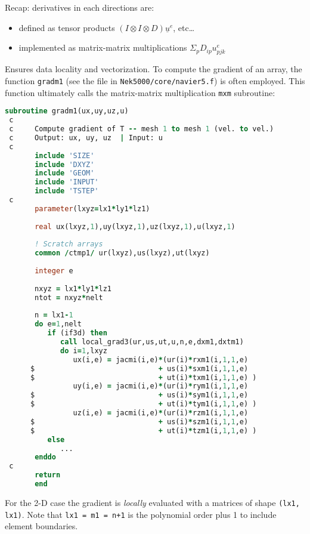 \documentclass[
  a4paper,
  10pt]{article}
\newcommand{\passthrough}[1]{#1}
\begin{document}
Recap: derivatives in each directions are:

\begin{itemize}
\item
  defined as tensor products \((I \otimes I \otimes D) \underline u^e\),
  etc\ldots{}
\item
  implemented as matrix-matrix multiplications
  \(\Sigma_p D_{ip}u^e_{pjk}\)
\end{itemize}

Ensures data locality and vectorization. To compute the gradient of an
array, the function \passthrough{\lstinline!gradm1!} (see the file in
\passthrough{\lstinline!Nek5000/core/navier5.f!}) is often employed.
This function ultimately calls the matrix-matrix multiplication
\passthrough{\lstinline!mxm!} subroutine:

\begin{lstlisting}[language=Fortran]
       subroutine gradm1(ux,uy,uz,u)
 c
 c     Compute gradient of T -- mesh 1 to mesh 1 (vel. to vel.)
 c     Output: ux, uy, uz  | Input: u
 c
       include 'SIZE'
       include 'DXYZ'
       include 'GEOM'
       include 'INPUT'
       include 'TSTEP'
 c
       parameter(lxyz=lx1*ly1*lz1)
 
       real ux(lxyz,1),uy(lxyz,1),uz(lxyz,1),u(lxyz,1)
 
       ! Scratch arrays
       common /ctmp1/ ur(lxyz),us(lxyz),ut(lxyz)
 
       integer e
 
       nxyz = lx1*ly1*lz1
       ntot = nxyz*nelt
 
       n = lx1-1
       do e=1,nelt
          if (if3d) then
             call local_grad3(ur,us,ut,u,n,e,dxm1,dxtm1)
             do i=1,lxyz
                ux(i,e) = jacmi(i,e)*(ur(i)*rxm1(i,1,1,e)
      $                             + us(i)*sxm1(i,1,1,e)
      $                             + ut(i)*txm1(i,1,1,e) )
                uy(i,e) = jacmi(i,e)*(ur(i)*rym1(i,1,1,e)
      $                             + us(i)*sym1(i,1,1,e)
      $                             + ut(i)*tym1(i,1,1,e) )
                uz(i,e) = jacmi(i,e)*(ur(i)*rzm1(i,1,1,e)
      $                             + us(i)*szm1(i,1,1,e)
      $                             + ut(i)*tzm1(i,1,1,e) )
          else
             ...
       enddo
 c
       return
       end
\end{lstlisting}

For the 2-D case the gradient is \emph{locally} evaluated with a
matrices of shape \passthrough{\lstinline!(lx1, lx1)!}. Note that
\passthrough{\lstinline!lx1 = m1 = n+1!} is the polynomial order plus 1
to include element boundaries.
\end{document}
